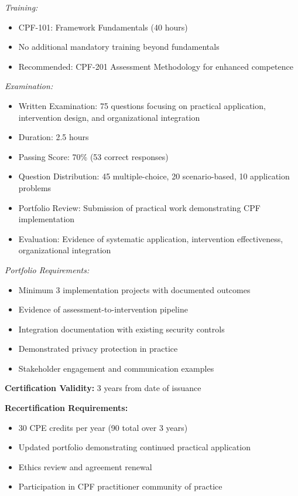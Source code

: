 \documentclass[11pt,a4paper]{article}
\begin{document}
\textit{Training:}
\begin{itemize}
\item CPF-101: Framework Fundamentals (40 hours)
\item No additional mandatory training beyond fundamentals
\item Recommended: CPF-201 Assessment Methodology for enhanced competence
\end{itemize}

\textit{Examination:}
\begin{itemize}
\item Written Examination: 75 questions focusing on practical application, intervention design, and organizational integration
\item Duration: 2.5 hours
\item Passing Score: 70\% (53 correct responses)
\item Question Distribution: 45 multiple-choice, 20 scenario-based, 10 application problems
\item Portfolio Review: Submission of practical work demonstrating CPF implementation
\item Evaluation: Evidence of systematic application, intervention effectiveness, organizational integration
\end{itemize}

\textit{Portfolio Requirements:}
\begin{itemize}
\item Minimum 3 implementation projects with documented outcomes
\item Evidence of assessment-to-intervention pipeline
\item Integration documentation with existing security controls
\item Demonstrated privacy protection in practice
\item Stakeholder engagement and communication examples
\end{itemize}

\textbf{Certification Validity:} 3 years from date of issuance

\textbf{Recertification Requirements:}
\begin{itemize}
\item 30 CPE credits per year (90 total over 3 years)
\item Updated portfolio demonstrating continued practical application
\item Ethics review and agreement renewal
\item Participation in CPF practitioner community of practice
\end{itemize}
\end{document}
